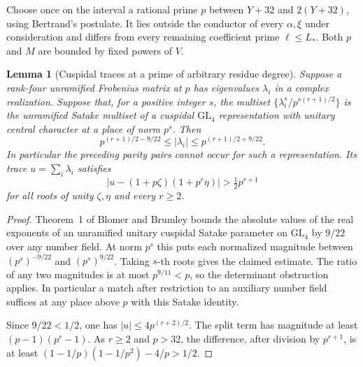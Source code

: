 \documentclass[a4paper,11pt]{article}
\newtheorem{lemma}[proposition]{Lemma}
\theoremstyle{definition}
\theoremstyle{remark}
\numberwithin{equation}{section}
\begin{document}
Choose once on the interval a rational prime \(p\) between
\(Y+32\) and \(2(Y+32)\), using Bertrand's postulate.
It lies outside the conductor of every \(\alpha,\xi\) under
consideration and differs from every remaining coefficient
prime \(\ell\le L_*\). Both \(p\) and \(M\) are bounded by
fixed powers of \(V\).

\begin{lemma}[Cuspidal traces at a prime of arbitrary residue degree]\leavevmode
\label{lem:cuspidaltrace433}
Suppose a rank-four unramified Frobenius matrix at \(p\) has
eigenvalues \(\lambda_i\) in a complex realization. Suppose
that, for a positive integer \(s\), the multiset
\(\{\lambda_i^s/p^{s(r+1)/2}\}\) is the unramified Satake
multiset of a cuspidal \(\mathrm{GL}_4\) representation with
unitary central character at a place of norm \(p^s\). Then
\[
 p^{(r+1)/2-9/22}\le|\lambda_i|\le p^{(r+1)/2+9/22}.
\]
In particular the preceding parity pairs cannot occur for
such a representation. Its trace \(u=\sum_i\lambda_i\) satisfies
\[
 \big|u-(1+p\zeta)(1+p^r\eta)\big|>\tfrac12p^{r+1}
\]
for all roots of unity \(\zeta,\eta\) and every \(r\ge2\).
\end{lemma}
\begin{proof}
Theorem~1 of Blomer and Brumley bounds the absolute values of
the real exponents of an unramified unitary cuspidal Satake
parameter on \(\mathrm{GL}_4\) by \(9/22\) over any number
field. At norm \(p^s\) this puts each normalized magnitude
between \((p^s)^{-9/22}\) and \((p^s)^{9/22}\).
Taking \(s\)-th roots gives the claimed estimate. The ratio
of any two magnitudes is at most \(p^{9/11}<p\), so the
determinant obstruction applies. In particular a match after
restriction to an auxiliary number field suffices at any place
above \(p\) with this Satake identity.~\cite{IX-VII-bb433}

Since \(9/22<1/2\), one has \(|u|\le4p^{(r+2)/2}\).
The split term has magnitude at least \((p-1)(p^r-1)\).
As \(r\ge2\) and \(p>32\), the difference, after division
by \(p^{r+1}\), is at least
\((1-1/p)(1-1/p^2)-4/p>1/2\).
\end{proof}
\end{document}
